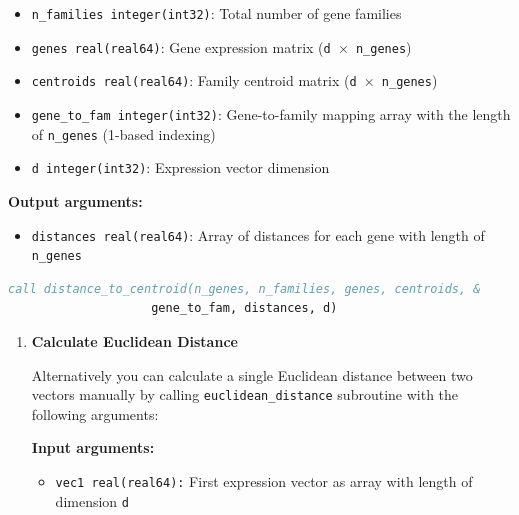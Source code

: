 \begin{enumerate}
\begin{itemize}
            \item \texttt{n\_families integer(int32)}: Total number of gene families
                  
            \item \texttt{genes real(real64)}: Gene expression matrix (\texttt{d
                  $\times$ n\_genes})
            
            \item \texttt{centroids real(real64)}: Family centroid matrix (\texttt{d
                  $\times$ n\_genes})
            
            \item \texttt{gene\_to\_fam integer(int32)}: Gene-to-family mapping array
                  with the length of \texttt{n\_genes} (1-based indexing)
                  
            \item \texttt{d integer(int32)}: Expression vector dimension
          \end{itemize}
          \textbf{Output arguments:}
          \begin{itemize}
            \item \texttt{distances real(real64)}: Array of distances for each gene
                  with length of \texttt{n\_genes}
          \end{itemize}
          \begin{lstlisting}[language=Fortran, caption={Distance to Centroid Calculation}]
call distance_to_centroid(n_genes, n_families, genes, centroids, &
                    gene_to_fam, distances, d)
          \end{lstlisting}
          
          \begin{enumerate}
            \item \textbf{Calculate Euclidean Distance}
                          
                  Alternatively you can calculate a single Euclidean distance between
                  two vectors manually by calling \texttt{euclidean\_distance}
                  subroutine with the following arguments:
                  
                  \textbf{Input arguments:}
                  \begin{itemize}
                    \item \texttt{vec1 real(real64):} First expression vector as
                          array with length of dimension \texttt{d}
                          

\end{itemize}
\end{enumerate}
\end{enumerate}
